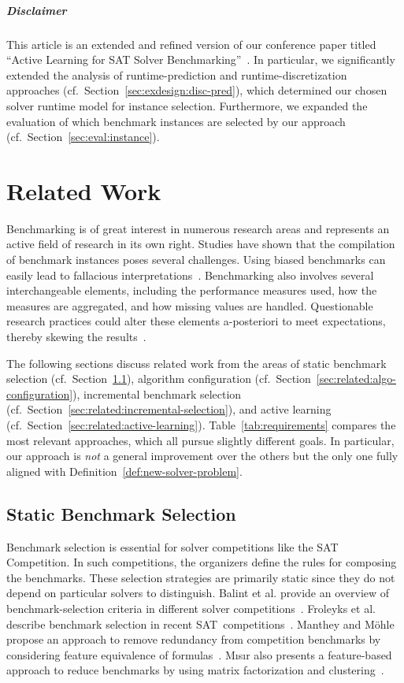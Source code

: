 \documentclass[sn-basic, Numbered]{sn-jnl} %
\begin{document}
\subparagraph{Disclaimer}

This article is an extended and refined version of our conference paper titled ``Active Learning for SAT Solver Benchmarking''~\cite{fuchs2023active}.
In particular, we significantly extended the analysis of runtime-prediction and runtime-discretization approaches (cf.~Section~\ref{sec:exdesign:disc-pred}), which determined our chosen solver runtime model for instance selection.
Furthermore, we expanded the evaluation of which benchmark instances are selected by our approach (cf.~Section~\ref{sec:eval:instance}).

\section{Related Work}
\label{sec:related}

Benchmarking is of great interest in numerous research areas and represents an active field of research in its own right.
Studies have shown that the compilation of benchmark instances poses several challenges.
Using biased benchmarks can easily lead to fallacious interpretations~\cite{abs-2107-07002}.
Benchmarking also involves several interchangeable elements, including the performance measures used, how the measures are aggregated, and how missing values are handled.
Questionable research practices could alter these elements a-posteriori to meet expectations, thereby skewing the results~\cite{NiesslHWCB22}.

The following sections discuss related work from the areas of static benchmark selection (cf.~Section~\ref{sec:related:static-selection}), algorithm configuration (cf.~Section~\ref{sec:related:algo-configuration}), incremental benchmark selection (cf.~Section~\ref{sec:related:incremental-selection}), and active learning (cf.~Section~\ref{sec:related:active-learning}).
Table~\ref{tab:requirements} compares the most relevant approaches, which all pursue slightly different goals.
In particular, our approach is \emph{not} a general improvement over the others but the only one fully aligned with Definition~\ref{def:new-solver-problem}.

\subsection{Static Benchmark Selection}
\label{sec:related:static-selection}

Benchmark selection is essential for solver competitions like the SAT Competition.
In such competitions, the organizers define the rules for composing the benchmarks.
These selection strategies are primarily static since they do not depend on particular solvers to distinguish.
Balint et al. provide an overview of benchmark-selection criteria in different solver competitions~\cite{balint2015overview}.
Froleyks et al. describe benchmark selection in recent SAT~competitions~\cite{FroleyksHIJS21}.
Manthey and Möhle propose an approach to remove redundancy from competition benchmarks by considering feature equivalence of formulas~\cite{manthey2016better}.
M{\i}s{\i}r also presents a feature-based approach to reduce benchmarks by using matrix factorization and clustering~\cite{misir2021benchmark}.
\end{document}
